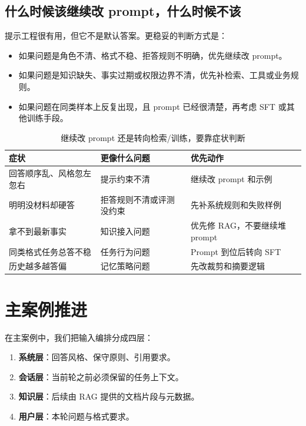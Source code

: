 \subsection{什么时候该继续改 prompt，什么时候不该}
提示工程很有用，但它不是默认答案。更稳妥的判断方式是：
\begin{itemize}
  \item 如果问题是角色不清、格式不稳、拒答规则不明确，优先继续改 prompt。
  \item 如果问题是知识缺失、事实过期或权限边界不清，优先补检索、工具或业务规则。
  \item 如果问题在同类样本上反复出现，且 prompt 已经很清楚，再考虑 SFT 或其他训练手段。
\end{itemize}

\begin{table}[H]
\centering
\small
\begin{tabularx}{\textwidth}{>{\raggedright\arraybackslash}p{3.1cm}>{\raggedright\arraybackslash}p{3.6cm}>{\raggedright\arraybackslash}X}
\toprule
\textbf{症状} & \textbf{更像什么问题} & \textbf{优先动作} \\
\midrule
回答顺序乱、风格忽左忽右 & 提示约束不清 & 继续改 prompt 和示例 \\
明明没材料却硬答 & 拒答规则不清或评测没约束 & 先补系统规则和失败样例 \\
拿不到最新事实 & 知识接入问题 & 优先修 RAG，不要继续堆 prompt \\
同类格式任务总答不稳 & 任务行为问题 & Prompt 到位后转向 SFT \\
历史越多越答偏 & 记忆策略问题 & 先改裁剪和摘要逻辑 \\
\bottomrule
\end{tabularx}
\caption{继续改 prompt 还是转向检索/训练，要靠症状判断}
\label{tab:prompt-routing}
\end{table}

\section{主案例推进}
在主案例中，我们把输入编排分成四层：
\begin{enumerate}
  \item \textbf{系统层}：回答风格、保守原则、引用要求。
  \item \textbf{会话层}：当前轮之前必须保留的任务上下文。
  \item \textbf{知识层}：后续由 RAG 提供的文档片段与元数据。
  \item \textbf{用户层}：本轮问题与格式要求。
\end{enumerate}

